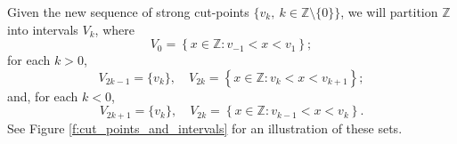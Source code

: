 \documentclass[a4paper,oneside,12pt]{amsart}
\theoremstyle{plain}
\theoremstyle{definition}
\theoremstyle{remark}
\newcommand{\Z}{{\mathbb{Z}}}
\begin{document}
Given the new sequence of strong cut-points $\{ v_k, ~ k \in \mathbb{Z} \setminus \{0\}\}$, we will partition $\mathbb{Z}$ into intervals $V_{k}$, where 
\begin{equation}
\label{e:def_V_0}
V_0 = \left\{x \in \Z \colon v_{-1} < x < v_{1} \right\};
\end{equation}
for each $k > 0$,
\begin{equation}
\label{e:def_V_k_pos}
V_{2k-1} = \{v_k\}, \quad V_{2k} = \left\{x \in \Z \colon v_{k} < x < v_{k+1} \right\};
\end{equation}
and, for each $k < 0$,
\begin{equation}
\label{e:def_V_k_neg}
    V_{2k+1} = \{v_k\}, \quad V_{2k} = \left\{x \in \Z \colon v_{k - 1} < x < v_{k} \right\}.
\end{equation}
See Figure \ref{f:cut_points_and_intervals} for an illustration of these sets.
\end{document}

